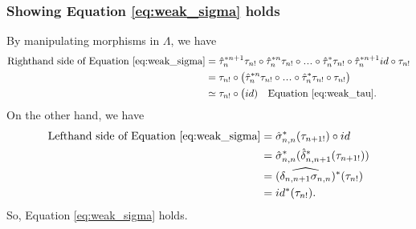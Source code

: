 \subsubsection{Showing Equation \ref{eq:weak_sigma} holds}\label{sec:weak_relations_sigma}
By manipulating morphisms in $\Lambda$, 
we have
\begin{align*}
\textrm{Righthand side of Equation \ref{eq:weak_sigma}}
&= 
\hat{\tau}_n^{*n+1}\tau_{n!} \circ 
  \hat{\tau}_n^{*n}\tau_{n!} \circ 
  \smdots \circ 
  \hat{\tau}_n^*\tau_{n!} \circ
  \hat{\tau}_n^{*n+1} id \circ 
  \tau_{n!}\\
&= 
\tau_{n!} \circ \big(
  \hat{\tau}_n^{*n}\tau_{n!} \circ 
  \smdots \circ 
  \hat{\tau}_n^*\tau_{n!} \circ
  \tau_{n!} \big)\\
&\simeq
\tau_{n!} \circ \big(id)
  \quad \textrm{Equation \ref{eq:weak_tau}.}\\  
\end{align*}
On the other hand, we have 
\begin{align*}
\textrm{Lefthand side of Equation \ref{eq:weak_sigma}}
&=
\hat{\sigma}_{n,n}^*(\tau_{n+1!}) \circ id\\
&=
\hat{\sigma}_{n,n}^*(
  \hat{\delta}_{n,n+1}^*(\tau_{n+1!}))\\
&=
(\widehat{\delta_{n,n+1}\sigma_{n,n}})^*
  (\tau_{n!})\\  
&=
id^*(\tau_{n!}).   
\end{align*}
So, Equation \ref{eq:weak_sigma} holds.